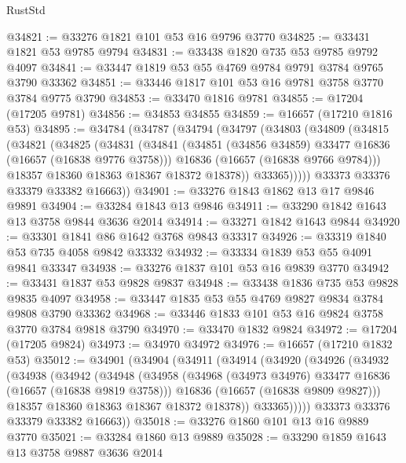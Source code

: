 \begin{lexlean}{RustStd}
\begin{coremodule}
@34821 := @33276 @1821 @101 @53 @16 @9796 @3770
@34825 := @33431 @1821 @53 @9785 @9794
@34831 := @33438 @1820 @735 @53 @9785 @9792 @4097
@34841 := @33447 @1819 @53 @55 @4769 @9784 @9791 @3784 @9765 @3790 @33362
@34851 := @33446 @1817 @101 @53 @16 @9781 @3758 @3770 @3784 @9775 @3790
@34853 := @33470 @1816 @9781
@34855 := @17204 (@17205 @9781)
@34856 := @34853 @34855
@34859 := @16657 (@17210 @1816 @53)
@34895 := @34784
    (@34787
      (@34794
        (@34797
          (@34803
            (@34809
              (@34815
                (@34821
                  (@34825
                    (@34831
                      (@34841
                        (@34851 (@34856 @34859) @33477 @16836 (@16657 (@16838 @9776 @3758)))
                        @16836
                        (@16657 (@16838 @9766 @9784)))
                      @18357
                      @18360
                      @18363
                      @18367
                      @18372
                      @18378))
                  @33365)))))
        @33373
        @33376
        @33379
        @33382
        @16663))
@34901 := @33276 @1843 @1862 @13 @17 @9846 @9891
@34904 := @33284 @1843 @13 @9846
@34911 := @33290 @1842 @1643 @13 @3758 @9844 @3636 @2014
@34914 := @33271 @1842 @1643 @9844
@34920 := @33301 @1841 @86 @1642 @3768 @9843 @33317
@34926 := @33319 @1840 @53 @735 @4058 @9842 @33332
@34932 := @33334 @1839 @53 @55 @4091 @9841 @33347
@34938 := @33276 @1837 @101 @53 @16 @9839 @3770
@34942 := @33431 @1837 @53 @9828 @9837
@34948 := @33438 @1836 @735 @53 @9828 @9835 @4097
@34958 := @33447 @1835 @53 @55 @4769 @9827 @9834 @3784 @9808 @3790 @33362
@34968 := @33446 @1833 @101 @53 @16 @9824 @3758 @3770 @3784 @9818 @3790
@34970 := @33470 @1832 @9824
@34972 := @17204 (@17205 @9824)
@34973 := @34970 @34972
@34976 := @16657 (@17210 @1832 @53)
@35012 := @34901
    (@34904
      (@34911
        (@34914
          (@34920
            (@34926
              (@34932
                (@34938
                  (@34942
                    (@34948
                      (@34958
                        (@34968 (@34973 @34976) @33477 @16836 (@16657 (@16838 @9819 @3758)))
                        @16836
                        (@16657 (@16838 @9809 @9827)))
                      @18357
                      @18360
                      @18363
                      @18367
                      @18372
                      @18378))
                  @33365)))))
        @33373
        @33376
        @33379
        @33382
        @16663))
@35018 := @33276 @1860 @101 @13 @16 @9889 @3770
@35021 := @33284 @1860 @13 @9889
@35028 := @33290 @1859 @1643 @13 @3758 @9887 @3636 @2014

\end{coremodule}
\end{lexlean}
